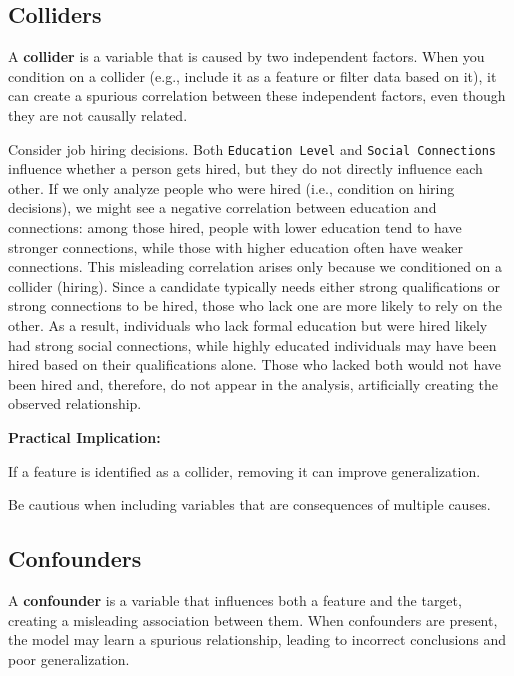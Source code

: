 \documentclass[12pt,openany, draft]{book}
\begin{document}
\subsection{Colliders}

A \textbf{collider} is a variable that is caused by two independent factors. When you condition on a collider (e.g., include it as a feature or filter data based on it), it can create a spurious correlation between these independent factors, even though they are not causally related.

\begin{examplebox}
Consider job hiring decisions. Both \texttt{Education Level} and \texttt{Social Connections} influence whether a person gets hired, but they do not directly influence each other. If we only analyze people who were hired (i.e., condition on hiring decisions), we might see a negative correlation between education and connections: among those hired, people with lower education tend to have stronger connections, while those with higher education often have weaker connections. This misleading correlation arises only because we conditioned on a collider (hiring). Since a candidate typically needs either strong qualifications or strong connections to be hired, those who lack one are more likely to rely on the other. As a result, individuals who lack formal education but were hired likely had strong social connections, while highly educated individuals may have been hired based on their qualifications alone. Those who lacked both would not have been hired and, therefore, do not appear in the analysis, artificially creating the observed relationship.
\end{examplebox}

\textbf{Practical Implication:}

If a feature is identified as a collider, removing it can improve generalization.

Be cautious when including variables that are consequences of multiple causes.

\subsection{Confounders}

A \textbf{confounder} is a variable that influences both a feature and the target, creating a misleading association between them. When confounders are present, the model may learn a spurious relationship, leading to incorrect conclusions and poor generalization.
\newline
\end{document}
